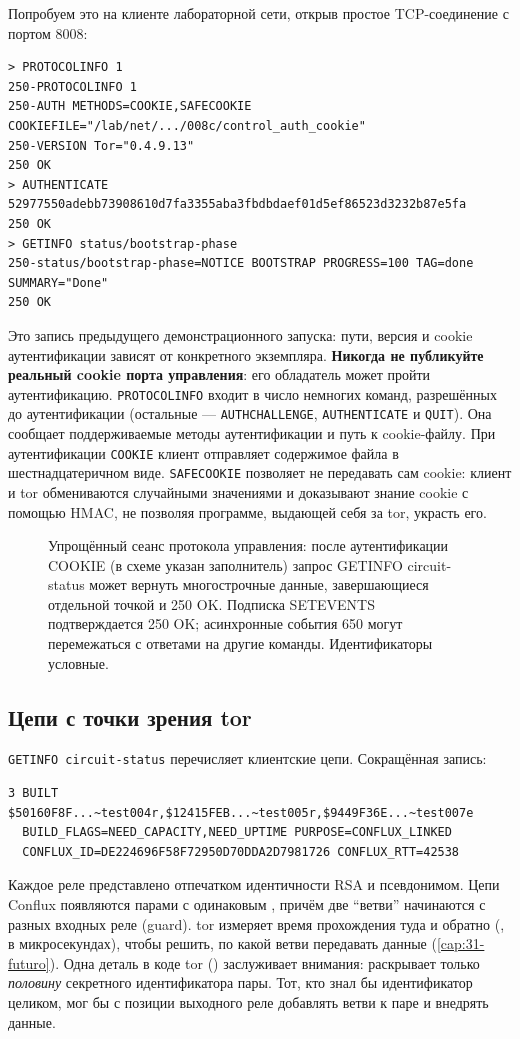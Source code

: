 Попробуем это на клиенте лабораторной сети, открыв простое TCP-соединение с портом 8008:
\begin{lstlisting}[numbers=none]
> PROTOCOLINFO 1
250-PROTOCOLINFO 1
250-AUTH METHODS=COOKIE,SAFECOOKIE COOKIEFILE="/lab/net/.../008c/control_auth_cookie"
250-VERSION Tor="0.4.9.13"
250 OK
> AUTHENTICATE 52977550adebb73908610d7fa3355aba3fbdbdaef01d5ef86523d3232b87e5fa
250 OK
> GETINFO status/bootstrap-phase
250-status/bootstrap-phase=NOTICE BOOTSTRAP PROGRESS=100 TAG=done SUMMARY="Done"
250 OK
\end{lstlisting}
Это запись предыдущего демонстрационного запуска: пути, версия и cookie аутентификации зависят от конкретного экземпляра. \textbf{Никогда не публикуйте реальный cookie порта управления}: его обладатель может пройти аутентификацию.
\texttt{PROTOCOLINFO} входит в число немногих команд, разрешённых до аутентификации (остальные — \texttt{AUTHCHALLENGE}, \texttt{AUTHENTICATE} и \texttt{QUIT}). Она сообщает поддерживаемые методы аутентификации и путь к cookie-файлу. При аутентификации \texttt{COOKIE} клиент отправляет содержимое файла в шестнадцатеричном виде. \texttt{SAFECOOKIE} позволяет не передавать сам cookie: клиент и tor обмениваются случайными значениями и доказывают знание cookie с помощью HMAC, не позволяя программе, выдающей себя за tor, украсть его.

\begin{figure}[htbp]
\centering

\caption{Упрощённый сеанс протокола управления: после аутентификации COOKIE (в схеме указан заполнитель) запрос GETINFO circuit-status может вернуть многострочные данные, завершающиеся отдельной точкой и 250 OK. Подписка SETEVENTS подтверждается 250 OK; асинхронные события 650 могут перемежаться с ответами на другие команды. Идентификаторы условные.}
\label{fig:controllo}
\end{figure}

\subsection{Цепи с точки зрения tor}

\texttt{GETINFO circuit-status} перечисляет клиентские цепи. Сокращённая запись:
\begin{lstlisting}[numbers=none]
3 BUILT $50160F8F...~test004r,$12415FEB...~test005r,$9449F36E...~test007e
  BUILD_FLAGS=NEED_CAPACITY,NEED_UPTIME PURPOSE=CONFLUX_LINKED
  CONFLUX_ID=DE224696F58F72950D70DDA2D7981726 CONFLUX_RTT=42538
\end{lstlisting}
Каждое реле представлено отпечатком идентичности RSA и псевдонимом. Цепи Conflux появляются парами с одинаковым , причём две \enquote{ветви} начинаются с разных входных реле (guard). tor измеряет время прохождения туда и обратно (, в микросекундах), чтобы решить, по какой ветви передавать данные (\cref{cap:31-futuro}). Одна деталь в коде tor () заслуживает внимания:  раскрывает только \emph{половину} секретного идентификатора пары. Тот, кто знал бы идентификатор целиком, мог бы с позиции выходного реле добавлять ветви к паре и внедрять данные.

